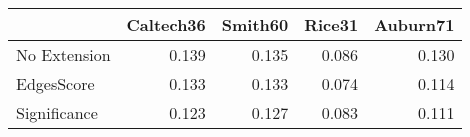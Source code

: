 \begin{tabular}{lrrrr}
\toprule
{} & Caltech36 & Smith60 & Rice31 & Auburn71 \\
\midrule
No Extension &     0.139 &   0.135 &  0.086 &    0.130 \\
EdgesScore   &     0.133 &   0.133 &  0.074 &    0.114 \\
Significance &     0.123 &   0.127 &  0.083 &    0.111 \\
\bottomrule
\end{tabular}
